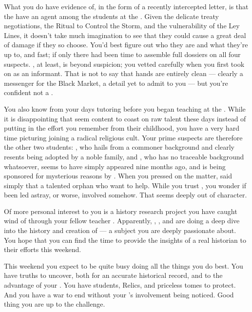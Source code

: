 \documentclass[char]{GL2020}
\begin{document}
What you do have evidence of, in the form of a recently intercepted letter, is that the \pGoaties{} have an agent among the \pFarm{} students at the \pSchool{}. Given the delicate treaty negotiations, the Ritual to Control the Storm, and the vulnerability of the Ley Lines, it doesn't take much imagination to see that they could cause a great deal of damage if they so choose. You'd best figure out who they are and what they're up to, and fast; if only there had been time to assemble full dossiers on all four suspects. \cLibAssist{}, at least, is beyond suspicion; you vetted \cLibAssist{\them} carefully when you first took \cLibAssist{\them} on as an informant. That is not to say that \cLibAssist{\their} hands are entirely clean — \cLibAssist{\theyare} clearly a messenger for the Black Market, a detail \cLibAssist{\theyhave} yet to admit to you — but you're confident \cLibAssist{\theyare} not a \pGoatie{}. 

You also know \cChupStudent{\full} from your days tutoring \cChupStudent{\them} before you began teaching at the \pSchool{}. While it is disappointing that \cChupStudent{\they} seem\cChupStudent{\verbs} content to coast on \cChupStudent{\their} raw talent these days instead of putting in the effort you remember from their childhood, you have a very hard time picturing \cChupStudent{\them} joining a radical religious cult. Your prime suspects are therefore the other two \pFarm{} students: \cAdopted{\full}, who hails from a commoner background and clearly resents being adopted by a noble family, and \cDisney{\full}, who has no traceable background whatsoever, seems to have simply appeared nine months ago, and is being sponsored for mysterious reasons by \cWildCard{}. When you pressed \cWildCard{} on the matter, \cWildCard{\they} said simply that \cDisney{\they \were} a talented orphan who \cWildCard{\they} want to help. While you trust \cWildCard{}, you wonder if \cWildCard{\they \have} been led astray, or worse, involved somehow. That seems deeply out of character.  

Of more personal interest to you is a history research project you have caught wind of through your fellow teacher \cBeetle{\full}. Apparently, \cEbbPriest{\full}, \cHeadScientist{\full}, and \cScholarship{\full} are doing a deep dive into the history and creation of \pEarth{}— a subject you are deeply passionate about. You hope that you can find the time to provide the insights of a real historian to their efforts this weekend.

This weekend you expect to be quite busy doing all the things you do best. You have truths to uncover, both for an accurate historical record, and to the advantage of your \cQueen{\Monarch}. You have students, Relics, and priceless tomes to protect. And you have a war to end without your \cQueen{\Monarch}’s involvement being noticed. Good thing you are up to the challenge.
\end{document}
